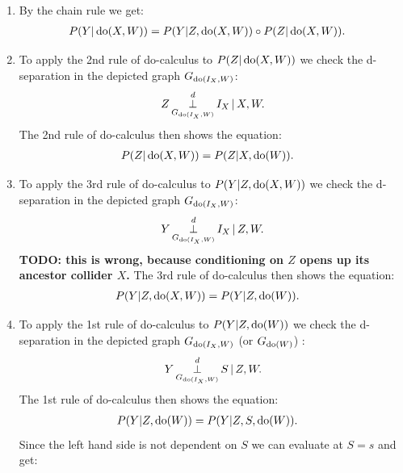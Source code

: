 {\begin{enumerate}
    \item By the chain rule we get:
        \begin{align*}
            P(Y|\operatorname{do}(X,W)) &= P(Y|Z,\operatorname{do}(X,W)) \circ P(Z|\operatorname{do}(X,W)).
        \end{align*}
          \item To apply the 2nd rule of do-calculus to $P(Z|\operatorname{do}(X,W))$ we check the d-separation in the depicted graph $G_{\operatorname{do}(I_X,W)}$:
         \begin{align*}
             Z \operatorname*{\perp}^d_{G_{\operatorname{do}(I_X,W)}} I_X \operatorname*{|} X,W.
         \end{align*}
         The 2nd rule of do-calculus then shows the equation:
         \begin{align*}
             P(Z|\operatorname{do}(X,W)) & = P(Z|X,\operatorname{do}(W)).
         \end{align*}
     \item To apply the 3rd rule of do-calculus to $P(Y|Z,\operatorname{do}(X,W))$ we check the d-separation in the depicted graph $G_{\operatorname{do}(I_X,W)}$: 
         \begin{align*}
             Y \operatorname*{\perp}^d_{G_{\operatorname{do}(I_X,W)}} I_X \operatorname*{|} Z,W.
         \end{align*}
         \textbf{TODO: this is wrong, because conditioning on $Z$ opens up its ancestor collider $X$.}
         The 3rd rule of do-calculus then shows the equation:
         \begin{align*}
             P(Y|Z,\operatorname{do}(X,W)) & = P(Y|Z,\operatorname{do}(W)).
         \end{align*}
     \item To apply the 1st rule of do-calculus to $P(Y|Z,\operatorname{do}(W))$ we check the d-separation in the depicted graph $G_{\operatorname{do}(I_X,W)}$ (or $G_{\operatorname{do}(W)}$) : 
         \begin{align*}
             Y \operatorname*{\perp}^d_{G_{\operatorname{do}(I_X,W)}} S \operatorname*{|} Z,W.
         \end{align*}
         The 1st rule of do-calculus then shows the equation:
         \begin{align*}
             P(Y|Z,\operatorname{do}(W)) & = P(Y|Z,S,\operatorname{do}(W)).
         \end{align*}
         Since the left hand side is not dependent on $S$ we can evaluate at $S=s$ and get:

\end{enumerate}}
